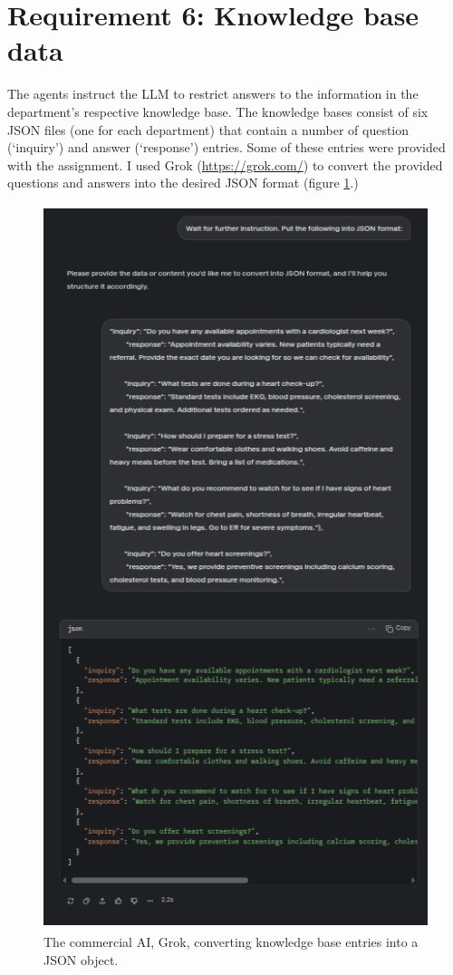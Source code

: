 \documentclass[11pt,letterpaper]{article}
\begin{document}
\section*{Requirement 6: Knowledge base data}
\tab The agents instruct the LLM to restrict answers to the information in the department's respective knowledge base. The knowledge bases consist of six JSON files (one for each department) that contain a number of question (`inquiry') and answer (`response') entries. Some of these entries were provided with the assignment. I used Grok (\url{https://grok.com/}) to convert the provided questions and answers into the desired JSON format (figure \ref{fig:grok_formatting}.)

\clearpage

\begin{figure}[h!]
    \centering
    \includegraphics[height=600pt]{grok_01.png}
    \caption{The commercial AI, Grok, converting knowledge base entries into a JSON object.}
    \label{fig:grok_formatting}
\end{figure}
\end{document}
